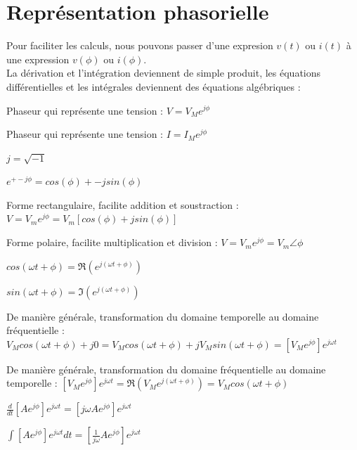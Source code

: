 \documentclass[11pt]{report}
\begin{document}
\section{Représentation phasorielle}
Pour faciliter les calculs, nous pouvons passer d'une expresion $v(t)$ ou $i(t)$ à une expression $v(\phi)$ ou $i(\phi)$.\\
La dérivation et l'intégration deviennent de simple produit, les équations différentielles et les intégrales deviennent des équations algébriques :

\begin{framed}
   Phaseur qui représente une tension : $V = V_Me^{j\phi}$\newline

   Phaseur qui représente une tension : $I = I_Me^{j\phi}$\newline

   $j = \sqrt{-1}$\newline

   $e^{+- j\phi} = cos(\phi) +- jsin(\phi)$\newline

   Forme rectangulaire, facilite addition et soustraction : $V = V_me^{j\phi} = V_m\left[ cos(\phi) + jsin(\phi) \right]$\newline

   Forme polaire, facilite multiplication et division : $V = V_me^{j\phi} = V_m\angle \phi$\newline

   $cos(\omega t + \phi) = \Re (e^{j(\omega t + \phi)})$ \newline

   $sin(\omega t + \phi) = \Im (e^{j(\omega t + \phi)})$ \newline

   De manière générale, transformation du domaine temporelle au domaine fréquentielle : \newline
  \indent $V_Mcos(\omega t + \phi) +j0 = V_Mcos(\omega t + \phi) + jV_M sin(\omega t + \phi) = \left[ V_Me^{j\phi}\right]e^{j\omega t}$\newline

   De manière générale, transformation du domaine fréquentielle au domaine temporelle : \newline
  \indent $\left[ V_Me^{j\phi}\right]e^{j\omega t} =  \Re (V_Me^{j(\omega t + \phi)}) = V_Mcos(\omega t + \phi)$\newline

   $\frac{d}{dt} \left[ Ae^{j\phi} \right]e^{j\omega t} = \left[ j\omega Ae^{j\phi} \right]e^{j\omega t} $\newline

   $\int { \left[ Ae^{ j\phi  } \right] e^{ j\omega t } } dt=\left[ \frac { 1 }{ j\omega  } Ae^{ j\phi  } \right] e^{ j\omega t }$\newline
\end{framed}
\end{document}
